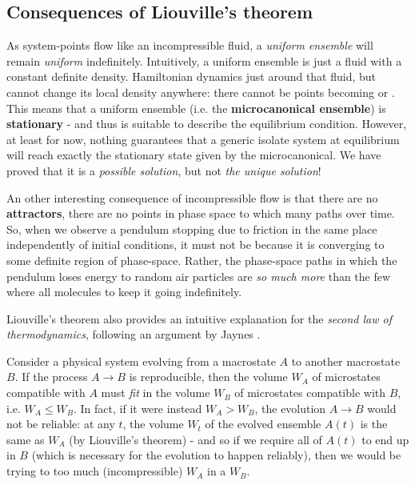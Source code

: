 \documentclass[../template.tex]{subfiles}
\begin{document}
\subsection{Consequences of Liouville's theorem}
As system-points flow like an incompressible fluid, a \textit{uniform ensemble} will remain \textit{uniform} indefinitely. Intuitively, a uniform ensemble is just a fluid with a constant definite density. Hamiltonian dynamics just  around that fluid, but cannot change its local density anywhere: there cannot be points becoming  or . This means that a uniform ensemble (i.e. the \textbf{microcanonical ensemble}) is \textbf{stationary} - and thus is suitable to describe the equilibrium condition. However, at least for now, nothing guarantees that a generic isolate system at equilibrium will reach exactly the stationary state given by the microcanonical. We have proved that it is a \textit{possible solution}, but not \textit{the unique solution}!

\medskip

An other interesting consequence of incompressible flow is that there are no \textbf{attractors}, there are no points in phase space to which many paths  over time. So, when we observe a pendulum stopping due to friction in the same place independently of initial conditions, it must not be because it is converging to some definite region of phase-space. Rather, the phase-space paths in which the pendulum loses energy to random air particles are \textit{so much more} than the few where all molecules  to keep it going indefinitely.  

\medskip

Liouville's theorem also provides an intuitive explanation for the \textit{second law of thermodynamics}, following an argument by Jaynes \cite{jaynes-secondlaw}\cite{jaynes2}.

Consider a physical system evolving from a macrostate $A$ to another macrostate $B$. If the process $A \to B$ is reproducible, then the volume $W_A$ of microstates compatible with $A$ must \textit{fit} in the volume $W_B$ of microstates compatible with $B$, i.e. $W_A \leq W_B$. In fact, if it were instead $W_A > W_B$, the evolution $A \to B$ would not be reliable: at any $t$, the volume $W_t$ of the evolved ensemble $A(t)$ is the same as $W_A$ (by Liouville's theorem) - and so 
if we require all of $A(t)$ to end up in $B$ (which is necessary for the evolution to happen reliably), then we would be trying to  too much (incompressible)  $W_A$ in a  $W_B$.
\end{document}
